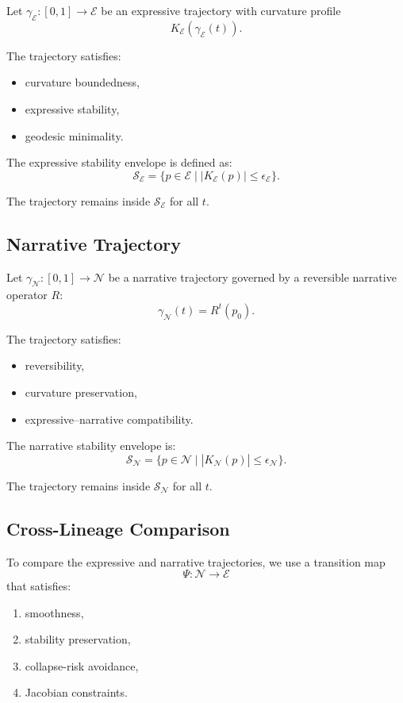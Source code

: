 Let $\gamma_{\mathcal{E}} : [0,1] \rightarrow \mathcal{E}$ be an expressive
trajectory with curvature profile
\[
K_{\mathcal{E}}(\gamma_{\mathcal{E}}(t)).
\]

The trajectory satisfies:

\begin{itemize}
    \item curvature boundedness,
    \item expressive stability,
    \item geodesic minimality.
\end{itemize}

The expressive stability envelope is defined as:
\[
\mathcal{S}_{\mathcal{E}} = \{ p \in \mathcal{E} \mid |K_{\mathcal{E}}(p)| \le \epsilon_{\mathcal{E}} \}.
\]

The trajectory remains inside $\mathcal{S}_{\mathcal{E}}$ for all $t$.

\subsection{Narrative Trajectory}

Let $\gamma_{\mathcal{N}} : [0,1] \rightarrow \mathcal{N}$ be a narrative
trajectory governed by a reversible narrative operator $R$:
\[
\gamma_{\mathcal{N}}(t) = R^t(p_0).
\]

The trajectory satisfies:

\begin{itemize}
    \item reversibility,
    \item curvature preservation,
    \item expressive–narrative compatibility.
\end{itemize}

The narrative stability envelope is:
\[
\mathcal{S}_{\mathcal{N}} = \{ p \in \mathcal{N} \mid |K_{\mathcal{N}}(p)| \le \epsilon_{\mathcal{N}} \}.
\]

The trajectory remains inside $\mathcal{S}_{\mathcal{N}}$ for all $t$.

\subsection{Cross-Lineage Comparison}

To compare the expressive and narrative trajectories, we use a transition map
\[
\Psi : \mathcal{N} \rightarrow \mathcal{E}
\]
that satisfies:

\begin{enumerate}
    \item smoothness,
    \item stability preservation,
    \item collapse-risk avoidance,
    \item Jacobian constraints.
\end{enumerate}

